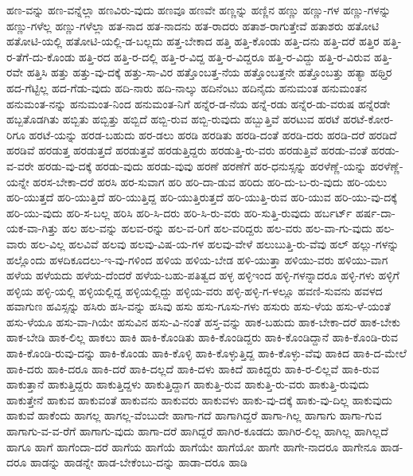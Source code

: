 {ಹಣ-ವನ್ನು
ಹಣ-ವನ್ನೆಲ್ಲಾ
ಹಣವಿರು-ವುದು
ಹಣವೂ
ಹಣವೇ
ಹಣ್ಣನ್ನು
ಹಣ್ಣಿನ
ಹಣ್ಣು
ಹಣ್ಣು-ಗಳ
ಹಣ್ಣು-ಗಳನ್ನು
ಹಣ್ಣು-ಗಳೆಲ್ಲ
ಹಣ್ಣು-ಗಳೆಲ್ಲಾ
ಹತ-ನಾದ
ಹತ-ನಾದನು
ಹತ-ರಾದರು
ಹತಾಶ-ರಾಗುತ್ತೇವೆ
ಹತಾಶರು
ಹತೋಟಿ
ಹತೋಟಿ-ಯಲ್ಲಿ
ಹತೋಟಿ-ಯಲ್ಲಿ-ಡ-ಬಲ್ಲದು
ಹತ್ತ-ಬೇಕಾದ
ಹತ್ತಿ
ಹತ್ತಿ-ಕೊಂಡು
ಹತ್ತಿ-ದನು
ಹತ್ತಿ-ದರೆ
ಹತ್ತಿರ
ಹತ್ತಿ-ರ-ತೆಗೆ-ದು-ಕೊಂಡು
ಹತ್ತಿ-ರದ
ಹತ್ತಿ-ರ-ದಲ್ಲಿ
ಹತ್ತಿ-ರ-ವಿದ್ದ
ಹತ್ತಿ-ರ-ವಿದ್ದರೂ
ಹತ್ತಿ-ರ-ವಿದ್ದು
ಹತ್ತಿ-ರ-ವಿರುವ
ಹತ್ತಿ-ರವೇ
ಹತ್ತಿಸಿ
ಹತ್ತು
ಹತ್ತು-ವು-ದಕ್ಕೆ
ಹತ್ತು-ಸಾ-ವಿರ
ಹತ್ತೊಂಬತ್ತ-ನೆಯ
ಹತ್ತೊಂಬತ್ತನೇ
ಹತ್ತೊಂಬತ್ತು
ಹತ್ಯಾ
ಹಥ್ತಿರ
ಹದ-ಗೆಟ್ಟಿಲ್ಲ
ಹದ-ಗೆಡು-ವುದು
ಹದಿ-ನಾರು
ಹದಿ-ನಾಲ್ಕು
ಹದಿನೆಂಟು
ಹದಿನೈದು
ಹನುಮಂತ
ಹನುಮಂತನ
ಹನುಮಂತ-ನನ್ನು
ಹನುಮಂತ-ನಿಂದ
ಹನುಮಂತ-ನಿಗೆ
ಹನ್ನೆರ-ಡ-ನೆಯ
ಹನ್ನೆ-ರಡು
ಹನ್ನೆರ-ಡು-ವರುಷ
ಹನ್ನೆರಡೇ
ಹಬ್ಬತೊಡಗಿತು
ಹಬ್ಬಿತು
ಹಬ್ಬಿತ್ತು
ಹಬ್ಬಿದೆ
ಹಬ್ಬಿ-ರುವ
ಹಬ್ಬಿ-ರುವುದು
ಹಬ್ಬುತ್ತಿವೆ
ಹರಟುವ
ಹರಟೆ
ಹರಟೆ-ಕೋರ-ರಿಗೂ
ಹರಟೆ-ಯನ್ನು
ಹರಡ-ಬಹುದು
ಹರ-ಡಲು
ಹರಡಿ
ಹರಡಿತು
ಹರಡಿ-ದಂತೆ
ಹರಡಿ-ದರು
ಹರಡಿ-ದರೆ
ಹರಡಿದೆ
ಹರಡಿವೆ
ಹರಡುತ್ತ
ಹರಡುತ್ತದೆ
ಹರಡುತ್ತವೆ
ಹರಡುತ್ತಿದ್ದರು
ಹರಡುತ್ತಿ-ರು-ವರು
ಹರಡುತ್ತಿವೆ
ಹರಡು-ವಂತೆ
ಹರಡು-ವ-ವರೇ
ಹರಡು-ವು-ದಕ್ಕೆ
ಹರಡು-ವುದು
ಹರಡು-ವುವು
ಹರಣೆ
ಹರಣೆಗೆ
ಹರ-ಧನುಸ್ಸನ್ನು
ಹರಳೆಣ್ಣೆ-ಯನ್ನು
ಹರಳೆಣ್ಣೆ-ಯನ್ನೇ
ಹರಸ-ಬೇಕಾ-ದರೆ
ಹರಸಿ
ಹರ-ಸುವಾಗ
ಹರಿ
ಹರಿ-ದಾ-ಡುವ
ಹರಿದು
ಹರಿ-ದು-ಬ-ರು-ವುದು
ಹರಿ-ಯಲು
ಹರಿ-ಯುತ್ತದೆ
ಹರಿ-ಯುತ್ತಿದೆ
ಹರಿ-ಯುತ್ತಿದ್ದ
ಹರಿ-ಯುತ್ತಿರುತ್ತದೆ
ಹರಿ-ಯುತ್ತಿ-ರುವ
ಹರಿ-ಯುವ
ಹರಿ-ಯು-ವು-ದಕ್ಕೆ
ಹರಿ-ಯು-ವುದು
ಹರಿ-ಸ-ಬಲ್ಲ
ಹರಿಸಿ
ಹರಿ-ಸಿ-ದರು
ಹರಿ-ಸಿ-ರು-ವರು
ಹರಿ-ಸುತ್ತಿ-ರುವುದು
ಹರ್ಬರ್ಟ್
ಹರ್ಷ-ದಾ-ಯಕ-ವಾ-ಗಿತ್ತು
ಹಲ
ಹಲ-ವನ್ನು
ಹಲವ-ರನ್ನು
ಹಲ-ವ-ರಿಗೆ
ಹಲ-ವರಿದ್ದರು
ಹಲ-ವರು
ಹಲ-ವಾ-ಗು-ವುದು
ಹಲ-ವಾರು
ಹಲ-ವಿಲ್ಲ
ಹಲವಿವೆ
ಹಲವು
ಹಲವು-ವಿಷ-ಯ-ಗಳ
ಹಲವು-ವೇಳೆ
ಹಲುಬುತ್ತಿ-ರು-ವೆವು
ಹಲ್
ಹಲ್ಲು-ಗಳನ್ನು
ಹಲ್ಲೊಂದು
ಹಳದಿಕೂದಲು-ಇ-ವು-ಗಳಿಂದ
ಹಳಿಯ
ಹಳಿಯ-ಬೇಡ
ಹಳಿ-ಯುತ್ತಾ
ಹಳಿಯು-ವರು
ಹಳಿಯು-ವಾಗ
ಹಳೆಯ
ಹಳೆಯದು
ಹಳೆಯ-ದೆಂದರೆ
ಹಳೆಯ-ಬಹು-ಪತಿತ್ವದ
ಹಳ್ಳ
ಹಳ್ಳಿಇಂದ
ಹಳ್ಳಿ-ಗಳನ್ನಾದರೂ
ಹಳ್ಳಿ-ಗಳು
ಹಳ್ಳಿಗೆ
ಹಳ್ಳಿಯ
ಹಳ್ಳಿ-ಯಲ್ಲಿ
ಹಳ್ಳಿಯಲ್ಲಿದ್ದ
ಹಳ್ಳಿಯಲ್ಲಿದ್ದು
ಹಳ್ಳಿಯ-ವರು
ಹಳ್ಳಿ-ಹಳ್ಳಿ-ಗ-ಳಲ್ಲೂ
ಹವಣಿ-ಸುವನು
ಹವಳದ
ಹವಾಗುಣ
ಹವಿಸ್ಸನ್ನು
ಹಸಿರು
ಹಸಿ-ವನ್ನು
ಹಸಿವು
ಹಸು
ಹಸು-ಗೂಸು-ಗಳು
ಹಸುರು
ಹಸು-ಳೆಯ
ಹಸು-ಳೆ-ಯಂತೆ
ಹಸು-ಳೆಯೂ
ಹಸು-ವಾ-ಗಿಯೇ
ಹಸುವಿನ
ಹಸು-ವಿ-ನಂತೆ
ಹಸ್ತ-ವನ್ನು
ಹಾಕ-ಬಹುದು
ಹಾಕ-ಬೇಕಾ-ದರೆ
ಹಾಕ-ಬೇಕು
ಹಾಕ-ಬೇಡಿ
ಹಾಕ-ಲಿಲ್ಲ
ಹಾಕಲು
ಹಾಕಿ
ಹಾಕಿ-ಕೊಂಡಿತು
ಹಾಕಿ-ಕೊಂಡಿದ್ದರು
ಹಾಕಿ-ಕೊಂಡಿದ್ದಾನೆ
ಹಾಕಿ-ಕೊಂಡಿ-ರುವ
ಹಾಕಿ-ಕೊಂಡಿ-ರುವು-ದನ್ನು
ಹಾಕಿ-ಕೊಂಡು
ಹಾಕಿ-ಕೊಳ್ಳಿ
ಹಾಕಿ-ಕೊಳ್ಳುತ್ತಿದ್ದ
ಹಾಕಿ-ಕೊಳ್ಳು-ವೆವು
ಹಾಕಿದ
ಹಾಕಿ-ದ-ಮೇಲೆ
ಹಾಕಿ-ದರು
ಹಾಕಿ-ದರೂ
ಹಾಕಿ-ದರೆ
ಹಾಕಿ-ದಲ್ಲದೆ
ಹಾಕಿ-ದಳು
ಹಾಕಿದೆ
ಹಾಕಿದ್ದರು
ಹಾಕಿ-ರ-ಲಿಲ್ಲವೆ
ಹಾಕಿ-ರುವ
ಹಾಕುತ್ತಾನೆ
ಹಾಕುತ್ತಿದ್ದರು
ಹಾಕುತ್ತಿದ್ದಳು
ಹಾಕುತ್ತಿದ್ದಾಗ
ಹಾಕುತ್ತಿ-ರುವ
ಹಾಕುತ್ತಿ-ರು-ವರು
ಹಾಕುತ್ತಿ-ರುವುದು
ಹಾಕುತ್ತೇನೆ
ಹಾಕುವ
ಹಾಕುವಂತೆ
ಹಾಕುವನು
ಹಾಕುವರು
ಹಾಕುವಳು
ಹಾಕು-ವು-ದಕ್ಕೆ
ಹಾಕು-ವು-ದಿಲ್ಲ
ಹಾಕುವುದು
ಹಾಕುವೆ
ಹಾಕೆಂದು
ಹಾಗಲ್ಲ
ಹಾಗಲ್ಲ-ವೆಂಬುದೇ
ಹಾಗಾ-ಗದೆ
ಹಾಗಾಗಿದ್ದರೆ
ಹಾಗಾ-ಗಿಲ್ಲ
ಹಾಗಾಗು
ಹಾಗಾ-ಗುವ
ಹಾಗಾಗು-ವ-ವ-ರೆಗೆ
ಹಾಗಾಗು-ವುದು
ಹಾಗಾ-ದರೆ
ಹಾಗಿದ್ದರೆ
ಹಾಗಿರ-ಕೂಡದು
ಹಾಗಿರ-ಲಿಲ್ಲ
ಹಾಗಿಲ್ಲ
ಹಾಗಿಲ್ಲದೆ
ಹಾಗೂ
ಹಾಗೆ
ಹಾಗೆಂದಾ-ದರೆ
ಹಾಗೆಯ
ಹಾಗೆಯೆ
ಹಾಗೆಯೇ
ಹಾಗೆಯೋ
ಹಾಗೇ
ಹಾಗೇ-ನಾದರೂ
ಹಾಗೇನೂ
ಹಾಡ-ದರೂ
ಹಾಡನ್ನು
ಹಾಡನ್ನೇ
ಹಾಡ-ಬೇಕೆಂಬು-ದನ್ನು
ಹಾಡಾ-ದರೂ
ಹಾಡಿ
}
